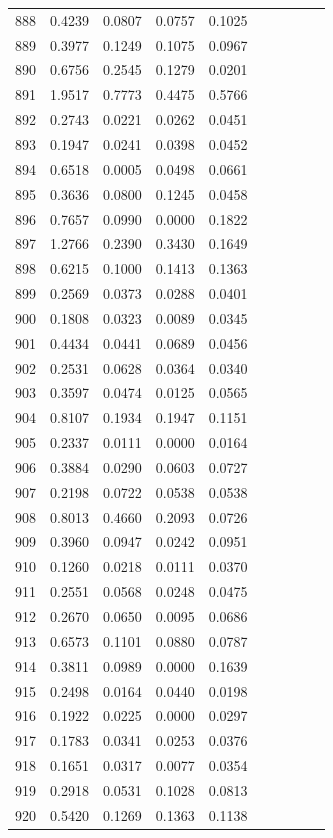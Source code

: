 \begin{table}
\begin{tabular}{cccccccccc}
888& 0.4239& 0.0807& 0.0757& 0.1025\\ 
889& 0.3977& 0.1249& 0.1075& 0.0967\\ 
890& 0.6756& 0.2545& 0.1279& 0.0201\\ 
891& 1.9517& 0.7773& 0.4475& 0.5766\\ 
892& 0.2743& 0.0221& 0.0262& 0.0451\\ 
893& 0.1947& 0.0241& 0.0398& 0.0452\\ 
894& 0.6518& 0.0005& 0.0498& 0.0661\\ 
895& 0.3636& 0.0800& 0.1245& 0.0458\\ 
896& 0.7657& 0.0990& 0.0000& 0.1822\\ 
897& 1.2766& 0.2390& 0.3430& 0.1649\\ 
898& 0.6215& 0.1000& 0.1413& 0.1363\\ 
899& 0.2569& 0.0373& 0.0288& 0.0401\\ 
900& 0.1808& 0.0323& 0.0089& 0.0345\\ 
901& 0.4434& 0.0441& 0.0689& 0.0456\\ 
902& 0.2531& 0.0628& 0.0364& 0.0340\\ 
903& 0.3597& 0.0474& 0.0125& 0.0565\\ 
904& 0.8107& 0.1934& 0.1947& 0.1151\\ 
905& 0.2337& 0.0111& 0.0000& 0.0164\\ 
906& 0.3884& 0.0290& 0.0603& 0.0727\\ 
907& 0.2198& 0.0722& 0.0538& 0.0538\\ 
908& 0.8013& 0.4660& 0.2093& 0.0726\\ 
909& 0.3960& 0.0947& 0.0242& 0.0951\\ 
910& 0.1260& 0.0218& 0.0111& 0.0370\\ 
911& 0.2551& 0.0568& 0.0248& 0.0475\\ 
912& 0.2670& 0.0650& 0.0095& 0.0686\\ 
913& 0.6573& 0.1101& 0.0880& 0.0787\\ 
914& 0.3811& 0.0989& 0.0000& 0.1639\\ 
915& 0.2498& 0.0164& 0.0440& 0.0198\\ 
916& 0.1922& 0.0225& 0.0000& 0.0297\\ 
917& 0.1783& 0.0341& 0.0253& 0.0376\\ 
918& 0.1651& 0.0317& 0.0077& 0.0354\\ 
919& 0.2918& 0.0531& 0.1028& 0.0813\\ 
920& 0.5420& 0.1269& 0.1363& 0.1138\\ 

\end{tabular}
\end{table}
